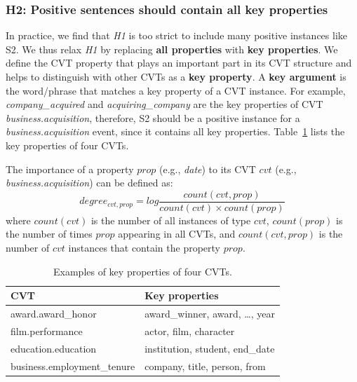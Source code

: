 
\subsubsection{H2: Positive sentences should contain all key properties}
In practice, we find that \emph{H1} is too strict to include many positive instances like S2. 
We thus relax \emph{H1} by replacing \textbf{all properties} with \textbf{ key properties}. We define the CVT property that plays an important part in its CVT structure and helps to distinguish with other CVTs as a \textbf{key property}. A \textbf{key argument} is the word/phrase that matches a key property of a CVT instance. For example, \emph{company\_acquired} and \emph{acquiring\_company} are the key properties of CVT \emph{business.acquisition}, therefore,  S2 should be a positive instance for a \emph{business.acquisition} event, since it contains all key properties. Table~\ref{tab:5} lists the key properties of four CVTs.

The importance of a property $prop$ (e.g., \emph{date}) to its CVT $cvt$ (e.g., \emph{business.acquisition}) can be defined as:
\begin{equation}
	degree_{cvt, prop} = log \frac{count(cvt, prop)}{count(cvt) \times count(prop)} 
\end{equation}
where $count(cvt)$ is the number of all instances of type $cvt$, $count(prop)$ is the number of times $prop$ appearing in all CVTs, and $count(cvt, prop)$ is the number of $cvt$ instances that contain the property $prop$.

\begin{table}
\centering
\small
\begin{tabular}{|l|l|} \hline
CVT & Key properties \\ \hline
award.award\_honor & award\_winner, award, \ldots, year \\ \hline
film.performance & actor, film, character \\ \hline
education.education & institution, student, end\_date \\ \hline
business.employment\_tenure & company, title, person, from \\ \hline
\end{tabular}
\caption{Examples of key properties of four CVTs.\label{tab:5}}
\end{table}

